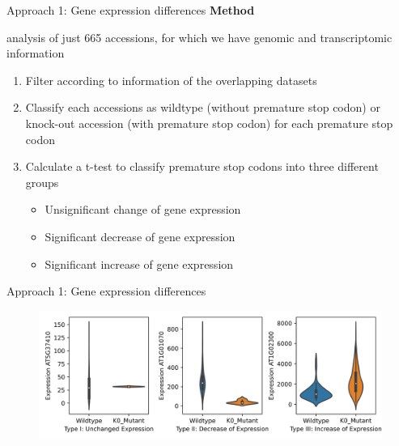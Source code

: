 \documentclass{beamer}
\begin{document}
\begin{frame}{Approach 1: Gene expression differences}
	\textbf{Method}

	analysis of just 665 accessions, for which we have genomic and transcriptomic information
	
	\vspace{5mm}
	\begin{enumerate}
		\item[1.)] Filter according to information of the overlapping datasets
		\item[2.)] Classify each accessions as wildtype (without premature stop codon) or knock-out accession (with premature stop codon) for each premature stop codon
		\item[3.)] Calculate a t-test to classify premature stop codons into three different groups
		\begin{itemize}
			\item Unsignificant change of gene expression
			\item Significant decrease of gene expression 
			\item Significant increase of gene expression
		\end{itemize}  
	\end{enumerate}
\end{frame}
\begin{frame}{Approach 1: Gene expression differences}
	\begin{figure}[tb]
		\centering
		\begin{minipage}[h]{1\textwidth}
		\centering
		\includegraphics[width=1\textwidth]{images/Cathegories_Premature_Stop_Codons.png}
		\label{fig:Cathegories}
		\end{minipage}
	\end{figure}
\end{frame}
\end{document}
